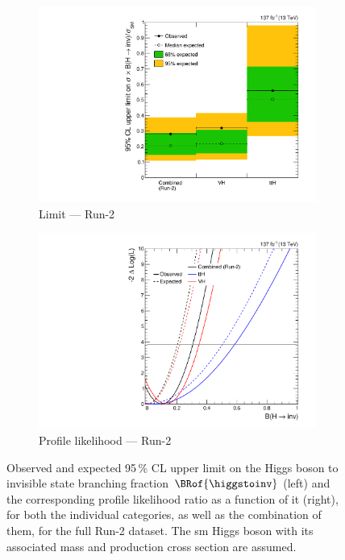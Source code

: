 \begin{figure}[htbp]
    \centering
    \begin{subfigure}[t]{0.45\textwidth}  %
        \includegraphics[width=\textwidth]{figures/limits/full_Run2/limit_Run2_comb_per_cat.pdf}
        \caption{Limit --- Run-2}
    \end{subfigure}
    \hspace{0.05\textwidth}
    \begin{subfigure}[t]{0.45\textwidth}
        \includegraphics[width=\textwidth]{figures/likelihood_scan/profile_likelihood_scan_Run2_per_cat.pdf}
        \caption{Profile likelihood --- Run-2}
    \end{subfigure}
    \caption[Observed and expected 95\,\% CL upper limit on the Higgs boson to invisible state branching fraction $\BRof{\higgstoinv}$ and the corresponding profile likelihood ratio as a function of it, for both the individual categories, as well as the combination of them, for the full Run-2 dataset]{Observed and expected 95\,\% CL upper limit on the Higgs boson to invisible state branching fraction $\BRof{\higgstoinv}$ (left) and the corresponding profile likelihood ratio as a function of it (right), for both the individual categories, as well as the combination of them, for the full Run-2 dataset. The \acrlong{sm} Higgs boson with its associated mass and production cross section are assumed.}
    \label{fig:htoinv_limit_likelihood_Run2_per_cat}
\end{figure}

